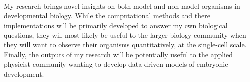 \paragraph{}My research brings novel insights on both model and non-model organisms in developmental biology.
While the computational methods and there implementations will be primarily developed to answer my own biological questions, they will most likely be useful to the larger biology community when they will want to observe their organisms quantitatively, at the single-cell scale.
Finally, the outputs of my research will be potentially useful to the applied physicist community wanting to develop data driven models of embryonic development.
